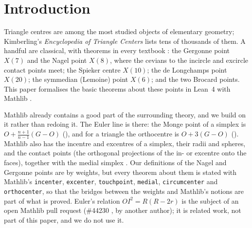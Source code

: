 \documentclass[11pt]{article}
\theoremstyle{definition}
\theoremstyle{remark}
\newcommand{\lean}[1]{\texttt{#1}}
\begin{document}
\section{Introduction}\label{sec:intro}
Triangle centres are among the most studied objects of elementary geometry; Kimberling's
\emph{Encyclopedia of Triangle Centers} \cite{etc} lists tens of thousands of them. A handful are
classical, with theorems in every textbook \cite{johnson1929,coxetergreitzer,honsberger}: the
Gergonne point $X(7)$ and the Nagel point $X(8)$, where the cevians to the incircle and excircle
contact points meet; the Spieker centre $X(10)$; the de Longchamps point $X(20)$; the symmedian
(Lemoine) point $X(6)$; and the two Brocard points. This paper formalises the basic theorems about
these points in Lean~4 \cite{lean4} with Mathlib \cite{mathlib}.

Mathlib already contains a good part of the surrounding theory, and we build on it rather than
redoing it. The Euler line is there: the Monge point of a simplex is
$O+\tfrac{n+1}{n-1}(G-O)$ (),
and for a triangle the orthocentre is $O+3(G-O)$
(). Mathlib also has the
incentre and excentres of a simplex, their radii and spheres, and the contact points
 (the orthogonal projections of the in- or excentre onto the faces),
together with the medial simplex . Our definitions of the Nagel and
Gergonne points are by weights, but every theorem about them is stated with Mathlib's
\lean{incenter}, \lean{excenter}, \lean{touchpoint}, \lean{medial}, \lean{circumcenter} and
\lean{orthocenter}, so that the bridges between the weights and Mathlib's notions are part of what is
proved. Euler's relation $OI^2=R(R-2r)$ is the subject of an open Mathlib pull request
(\#44230 \cite{pr44230}, by another author); it is related work, not part of this paper, and we do not use it.
\end{document}
